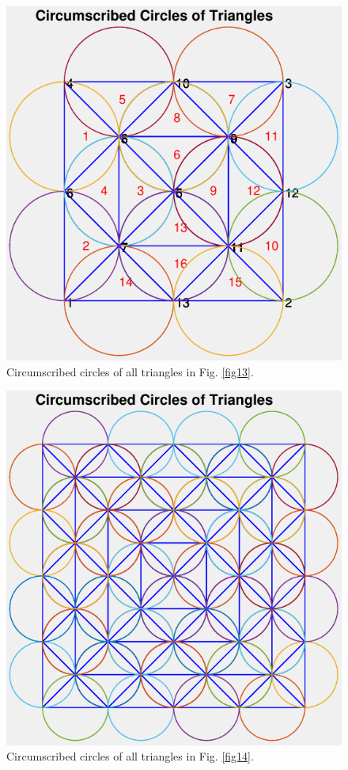 \documentclass[11pt,a4paper,center,notitlepage]{article}
\numberwithin{equation}{section}
\begin{document}
\begin{figure}[H]
\centering
\includegraphics[scale=0.9]{10}
\caption{Circumscribed circles of all triangles in Fig. \ref{fig13}.}
\end{figure}

\begin{figure}[H]
\centering
\includegraphics[scale=0.9]{11}
\caption{Circumscribed circles of all triangles in Fig. \ref{fig14}.}
\end{figure}
\end{document}
